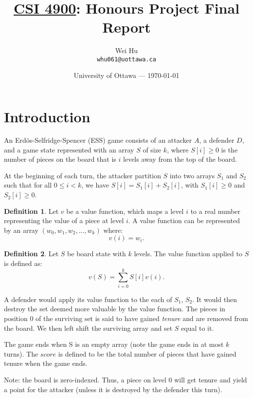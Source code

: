\documentclass{article}
\title{\underline{CSI 4900}: Honours Project Final Report}
\author{Wei Hu\\ \texttt{whu061@uottawa.ca}}
\date{University of Ottawa --- \today}
\theoremstyle{plain}
\theoremstyle{definition}
\newtheorem{defn}{Definition}[section]
\theoremstyle{remark}
\begin{document}
\maketitle %
\tableofcontents

%
% 
\newpage
\section{Introduction} 

An Erd\"os-Selfridge-Spencer (ESS) game consists of an attacker $A$, a defender $D$, and a game state represented with an array $S$ of size $k$, where $S[i] \ge 0$ is the number of pieces on the board that is $i$ levels away from the top of the board. 

At the beginning of each turn, the attacker partition $S$ into two arrays $S_1$ and $S_2$ such that for all $0 \le i < k$, we have $S[i] = S_1[i] + S_2[i]$, with $S_1[i] \ge 0$ and $S_2[i] \ge 0$.

\begin{defn}
	Let $v$ be a value function, which maps a level $i$ to a real number representing the value of a piece at level $i$. A value function can be represented by an array $(w_{0}, w_{1}, w_{2}, ... , w_{k})$ where:
	\begin{equation*}
		v(i) = w_{i}.
	\end{equation*}
\end{defn}

\begin{defn}
	Let $S$ be board state with $k$ levels. The value function applied to $S$ is defined as:
	\begin{equation*}
		v(S) = \sum_{i = 0}^k S[i]v(i).
	\end{equation*}
\end{defn}

A defender would apply its value function to the each of $S_1$, $S_2$. It would then destroy the set deemed more valuable by the value function. The pieces in position $0$ of the surviving set is said to have gained \textit{tenure} and are removed from the board. We then left shift the surviving array and set $S$ equal to it. 

The game ends when S is an empty array (note the game ends in at most $k$ turns).
The $score$ is defined to be the total number of pieces that have gained tenure when the game ends.

Note: the board is zero-indexed. Thus, a piece on level $0$ will get tenure and yield a point for the attacker (unless it is destroyed by the defender this turn). 
\end{document}
